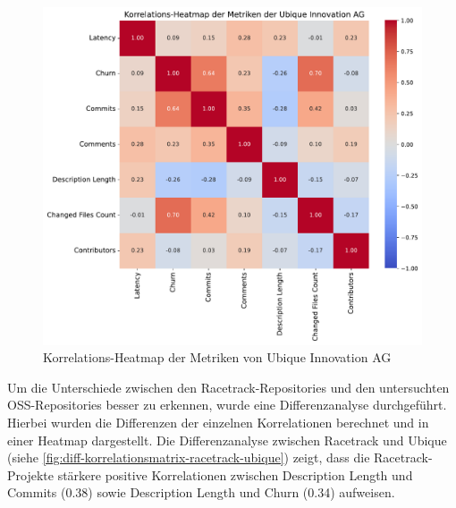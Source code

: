 \begin{figure}[htbp]
\includegraphics[width=\textwidth]{Figures/ubique-korrelationsmatrix.pdf}
\caption{Korrelations-Heatmap der Metriken von Ubique Innovation AG}
\label{fig:korrelationsmatrix-ubique}
\end{figure}


Um die Unterschiede zwischen den Racetrack-Repositories und den untersuchten OSS-Repositories besser zu erkennen, wurde eine Differenzanalyse durchgeführt. Hierbei wurden die Differenzen der einzelnen Korrelationen berechnet und in einer Heatmap dargestellt. Die Differenzanalyse zwischen Racetrack und Ubique (siehe \autoref{fig:diff-korrelationsmatrix-racetrack-ubique}) zeigt, dass die Racetrack-Projekte stärkere positive Korrelationen zwischen Description Length und Commits (0.38) sowie Description Length und Churn (0.34) aufweisen.

